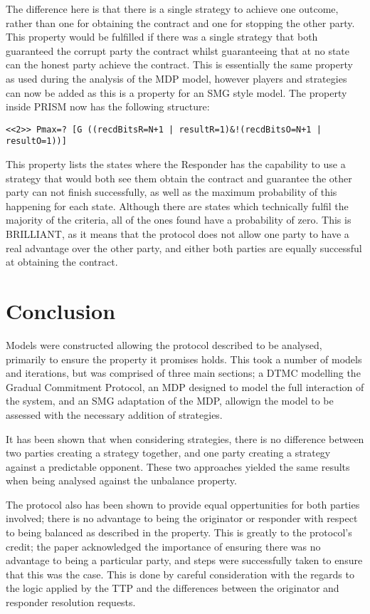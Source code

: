 \documentclass{l4proj}
\begin{document}
The difference here is that there is a single strategy to achieve one outcome, rather than one for obtaining the contract and one for stopping the other party. This property would be fulfilled if there was a single strategy that both guaranteed the corrupt party the contract whilst guaranteeing that at no state can the honest party achieve the contract. This is essentially the same property as used during the analysis of the MDP model, however players and strategies can now be added as this is a property for an SMG style model. The property inside PRISM now has the following structure:
\begin{lstlisting}
<<2>> Pmax=? [G ((recdBitsR=N+1 | resultR=1)&!(recdBitsO=N+1 | resultO=1))]
\end{lstlisting}
This property lists the states where the Responder has the capability to use a strategy that would both see them obtain the contract and guarantee the other party can not finish successfully, as well as the maximum probability of this happening for each state. Although there are states which technically fulfil the majority of the criteria, all of the ones found have a probability of zero. This is BRILLIANT, as it means that the protocol does not allow one party to have a real advantage over the other party, and either both parties are equally successful at obtaining the contract. 



\chapter{Conclusion}

Models were constructed allowing the protocol described to be analysed, primarily to ensure the property it promises holds. This took a number of models and iterations, but was comprised of three main sections; a DTMC modelling the Gradual Commitment Protocol, an MDP designed to model the full interaction of the system, and an SMG adaptation of the MDP, allowign the model to be assessed with the necessary addition of strategies.

It has been shown that when considering strategies, there is no difference between two parties creating a strategy together, and one party creating a strategy against a predictable opponent. These two approaches yielded the same results when being analysed against the unbalance property.

The protocol also has been shown to provide equal oppertunities for both parties involved; there is no advantage to being the originator or responder with respect to being balanced as described in the property. This is greatly to the protocol's credit; the paper acknowledged the importance of ensuring there was no advantage to being a particular party, and steps were successfully taken to ensure that this was the case. This is done by careful consideration with the regards to the logic applied by the TTP and the differences between the originator and responder resolution requests.
\end{document}
